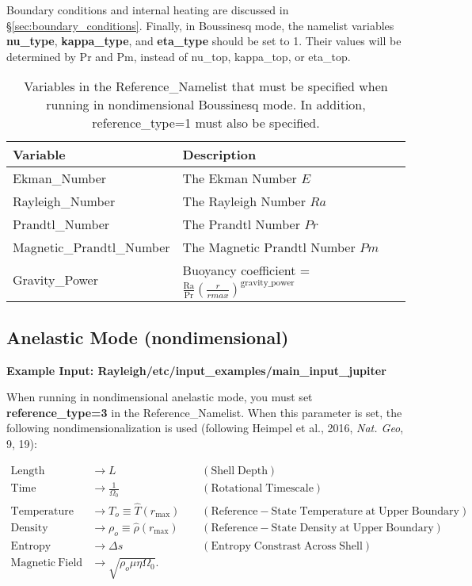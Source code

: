 Boundary conditions and internal heating are discussed in \S \ref{sec:boundary_conditions}.   Finally, in Boussinesq mode, the namelist variables \textbf{nu\_type}, \textbf{kappa\_type}, and \textbf{eta\_type} should be set to 1.   Their values will be determined by Pr and Pm, instead of nu\_top, kappa\_top, or eta\_top.
\begin{table}
\centering
\begin{tabular}{| l | l |}
\hline
Variable & Description \\
\hline
Ekman\_Number                  & The Ekman Number $E$ \\
Rayleigh\_Number               & The Rayleigh Number $Ra$ \\
Prandtl\_Number               & The Prandtl Number $Pr$ \\
Magnetic\_Prandtl\_Number             & The Magnetic Prandtl Number $Pm$ \\
Gravity\_Power & Buoyancy coefficient = $\frac{\mathrm{Ra}}{\mathrm{Pr}}\left(\frac{r}{rmax} \right)^\mathrm{gravity\_power}$ \\
\hline
\end{tabular}
\caption{\label{table:boussinesq} Variables in the Reference\_Namelist that must be specified when running in nondimensional Boussinesq mode. In addition, reference\_type=1 must also be specified.}
\end{table}



\clearpage
\subsection{Anelastic Mode (nondimensional)}

\textbf{Example Input:  Rayleigh/etc/input\_examples/main\_input\_jupiter}


When running in nondimensional anelastic mode, you must set \textbf{reference\_type=3} in the Reference\_Namelist.  When this parameter is set, the following nondimensionalization is used (following Heimpel et al., 2016, \textit{Nat. Geo}, 9, 19):

\begin{align*}
\mathrm{Length} &\rightarrow L &\;\;\;\; \mathrm{(Shell\; Depth)} \\
\mathrm{Time} &\rightarrow   \frac{1}{\Omega_0} &\;\;\;\; \mathrm{(Rotational\; Timescale)}\\
\mathrm{Temperature} &\rightarrow T_o\equiv\hat{T}(r_\mathrm{max})&\;\;\;\; \mathrm{(Reference-State\; Temperature\; at\; Upper\; Boundary)} \\
\mathrm{Density} &\rightarrow \rho_o\equiv\hat{\rho}(r_\mathrm{max})&\;\;\;\; \mathrm{(Reference-State\; Density\; at\; Upper\; Boundary)} \\
\mathrm{Entropy} &\rightarrow \Delta{s}&\;\;\;\; \mathrm{(Entropy\; Constrast\; Across\; Shell)} \\
\mathrm{Magnetic~Field} &\rightarrow \sqrt{\rho_o\mu\eta\Omega_0}.
\end{align*}


